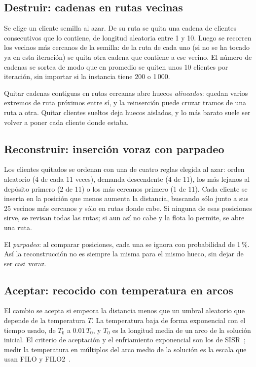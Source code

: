 \documentclass[11pt,a4paper]{article}
\begin{document}
\subsection{Destruir: cadenas en rutas vecinas}

Se elige un cliente semilla al azar. De su ruta se quita una cadena de clientes consecutivos que lo
contiene, de longitud aleatoria entre 1 y 10. Luego se recorren los vecinos más cercanos de la
semilla: de la ruta de cada uno (si no se ha tocado ya en esta iteración) se quita otra cadena que
contiene a ese vecino. El número de cadenas se sortea de modo que en promedio se quiten unos 10
clientes por iteración, sin importar si la instancia tiene 200 o 1\,000.

Quitar cadenas contiguas en rutas cercanas abre huecos \emph{alineados}: quedan varios extremos de ruta
próximos entre sí, y la reinserción puede cruzar tramos de una ruta a otra. Quitar clientes sueltos
deja huecos aislados, y lo más barato suele ser volver a poner cada cliente donde estaba.

\subsection{Reconstruir: inserción voraz con parpadeo}

Los clientes quitados se ordenan con una de cuatro reglas elegida al azar: orden aleatorio (4 de cada
11 veces), demanda descendente (4 de 11), los más lejanos al depósito primero (2 de 11) o los más
cercanos primero (1 de 11). Cada cliente se inserta en la posición que menos aumenta la distancia,
buscando sólo junto a sus 25 vecinos más cercanos y sólo en rutas donde cabe. Si ninguna de esas
posiciones sirve, se revisan todas las rutas; si aun así no cabe y la flota lo permite, se abre una
ruta.

El \emph{parpadeo}: al comparar posiciones, cada una se ignora con probabilidad de 1\,\%. Así la
reconstrucción no es siempre la misma para el mismo hueco, sin dejar de ser casi voraz.

\subsection{Aceptar: recocido con temperatura en arcos}

El cambio se acepta si empeora la distancia menos que un umbral aleatorio que depende de la temperatura
$T$. La temperatura baja de forma exponencial con el tiempo usado, de $T_0$ a $0.01\,T_0$, y $T_0$ es
la longitud media de un arco de la solución inicial. El criterio de aceptación y el enfriamiento
exponencial son los de SISR~\cite{christiaens2020}; medir la temperatura en múltiplos del arco medio
de la solución es la escala que usan FILO y FILO2~\cite{accorsi2021,accorsi2023}.
\end{document}
